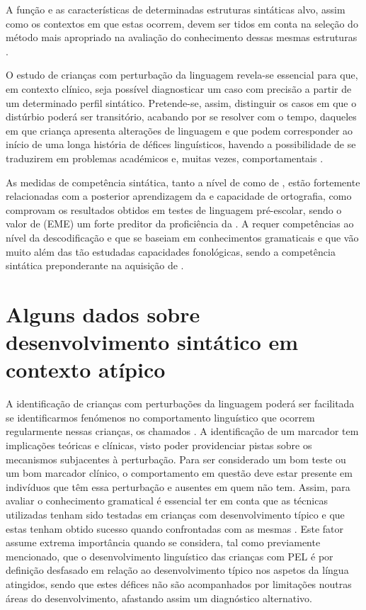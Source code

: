 \documentclass[output=paper]{LSP/langsci}
\begin{document}
A função e as características de determinadas estruturas sintáticas alvo, assim como os contextos em que estas ocorrem, devem ser tidos em conta na seleção do método mais apropriado na avaliação do conhecimento dessas mesmas estruturas \citep{zukowski2004}.

O estudo de crianças com perturbação da linguagem revela-se essencial para que, em contexto clínico, seja possível diagnosticar um caso com precisão a partir de um determinado perfil sintático. Pretende-se, assim, distinguir os casos em que o distúrbio poderá ser transitório, acabando por se resolver com o tempo, daqueles em que criança apresenta alterações de linguagem e que podem corresponder ao início de uma longa história de défices linguísticos, havendo a possibilidade de se traduzirem em problemas académicos e, muitas vezes, comportamentais \citep{bishopedmunson1987}. 

As medidas de competência sintática, tanto a nível de  como de , estão fortemente relacionadas com a posterior aprendizagem da  e capacidade de ortografia, como comprovam os resultados obtidos em testes de linguagem pré-escolar, sendo o valor de  (EME) um forte preditor da proficiência da  \citep{bishopadams1990}. A  requer competências ao nível da descodificação e  que se baseiam em conhecimentos gramaticais e que vão muito além das tão estudadas capacidades fonológicas, sendo a competência sintática preponderante na aquisição de  \citep{schuele2004}. 
\section{Alguns dados sobre desenvolvimento sintático em contexto atípico}
\label{sec:martins_dados}

\largerpage A identificação de crianças com perturbações da linguagem poderá ser facilitada se identificarmos fenómenos no comportamento linguístico que ocorrem regularmente nessas crianças, os chamados . A identificação de um marcador tem implicações teóricas e clínicas, visto poder providenciar pistas sobre os mecanismos subjacentes à perturbação. Para ser considerado um bom teste ou um bom marcador clínico, o comportamento em questão deve estar presente em indivíduos que têm essa perturbação e ausentes em quem não tem. Assim, para avaliar o conhecimento gramatical é essencial ter em conta que as técnicas utilizadas tenham sido testadas em crianças com desenvolvimento típico e que estas tenham obtido sucesso quando confrontadas com as mesmas \citep{zukowski2004}. Este fator assume extrema importância quando se considera, tal como previamente mencionado, que o desenvolvimento linguístico das crianças com PEL é por definição desfasado em relação ao desenvolvimento típico nos aspetos da língua atingidos, sendo que estes défices não são acompanhados por limitações noutras áreas do desenvolvimento, afastando assim um diagnóstico alternativo. 
\end{document}

